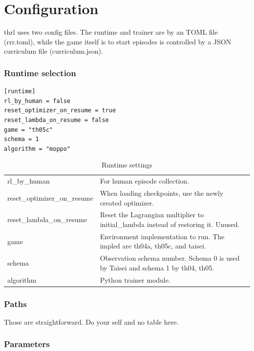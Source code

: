 \chapter{Configuration}
\label{ch:config}


thrl uses two config files.  The runtime and trainer are
by an TOML file (rrr.toml), while the game itself
is to start episodes is controlled by a JSON curriculum file
(curriculum.json). 

\subsection{Runtime selection}

\begin{lstlisting}[style=darkbase]
[runtime]
rl_by_human = false
reset_optimizer_on_resume = true
reset_lambda_on_resume = false
game = "th05c"
schema = 1
algorithm = "moppo"
\end{lstlisting}

\begin{table}[ht]
\centering
\begin{tabularx}{\textwidth}{>{\ttfamily}l X}
\hline
\hline
rl\_by\_human & For human episode collection. \\
reset\_optimizer\_on\_resume & When loading checkpoints, use the newly created optimizer. \\
reset\_lambda\_on\_resume & Reset the Lagrangian multiplier to initial\_lambda instead of restoring it. Unused. \\
game & Environment implementation to run.  The impled are th04a, th05c, and taisei. \\
schema & Observation schema number.  Schema 0 is used by Taisei and schema 1 by th04, th05. \\
algorithm & Python trainer module. \\
\hline
\end{tabularx}
\caption{Runtime settings}
\label{tab:runtime-settings}
\end{table}


\subsection{Paths}

Those are straightforward. Do your self and no table here.

\subsection{Parameters}

